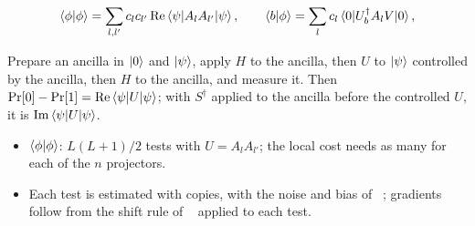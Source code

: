 \documentclass[handoutsbeamer.tex]{subfiles}
\begin{document}
\begin{frame}
\onp{\footnotesize}
\begin{equation}\label{eq:ch12:terms}
    \braket{\phi|\phi} = \sum_{l,l'}c_lc_{l'}\,\mathrm{Re}\braket{\psi|A_lA_{l'}|\psi},\qquad
    \braket{b|\phi} = \sum_lc_l\braket{0|U_b^\dagger A_lV|0},
\end{equation}
\begin{lem}\label{lem:ch12:hadamard}
Prepare an ancilla in $\ket0$ and $\ket\psi$, apply $H$ to the ancilla, then $U$ to $\ket\psi$ controlled by the ancilla, then $H$ to the ancilla, and measure it. Then $\mathrm{Pr}[0]-\mathrm{Pr}[1] = \mathrm{Re}\braket{\psi|U|\psi}$; with $S^\dagger$ applied to the ancilla before the controlled $U$, it is $\mathrm{Im}\braket{\psi|U|\psi}$.
\end{lem}
\begin{itemize}\setlength\itemsep{0.2em}
    \item $\braket{\phi|\phi}$: $L(L+1)/2$ tests with $U = A_lA_{l'}$; the local cost needs as many for each of the $n$ projectors.
    \item Each test is estimated with copies, with the noise and bias of \Chap~; gradients follow from the shift rule of \Chap~ applied to each test.
\end{itemize}
\end{frame}
\end{document}
